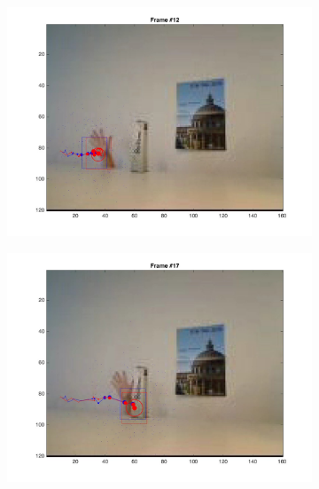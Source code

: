 \documentclass{ethz_report}
\begin{document}
\begin{figure}[h]
\begin{subfigure}[b]{.25\textwidth}
        \includegraphics[width=1\linewidth]{images/video2_observe_low_11}
    \end{subfigure}%
    \begin{subfigure}[b]{.25\textwidth}
        \centering
        \includegraphics[width=1\linewidth]{images/video2_observe_low_16}
    \end{subfigure}
    \begin{subfigure}[b]{.25\textwidth}
        \centering

\end{subfigure}
\end{figure}
\end{document}
